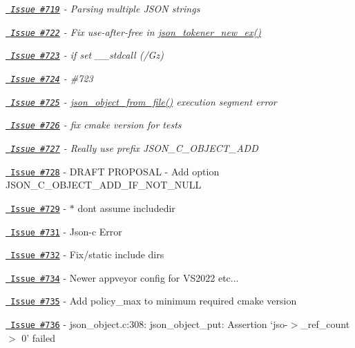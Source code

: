\begin{DoxyItemize}
\item {\itshape \href{https://github.com/json-c/json-c/issues/719}{\texttt{ Issue \#719}} -\/ Parsing multiple JSON strings}
\item {\itshape \href{https://github.com/json-c/json-c/issues/722}{\texttt{ Issue \#722}} -\/ Fix use-\/after-\/free in \mbox{\hyperlink{json__tokener_8h_a6a1583ddd434e13515d6232de813462e}{json\+\_\+tokener\+\_\+new\+\_\+ex()}}}
\item {\itshape \href{https://github.com/json-c/json-c/issues/723}{\texttt{ Issue \#723}} -\/ if set \+\_\+\+\_\+stdcall (/\+Gz)}
\item {\itshape \href{https://github.com/json-c/json-c/issues/724}{\texttt{ Issue \#724}} -\/ \#723}
\item {\itshape \href{https://github.com/json-c/json-c/issues/725}{\texttt{ Issue \#725}} -\/ \mbox{\hyperlink{json__util_8h_a03119ec0a71af4eee95318e9b2aaf05b}{json\+\_\+object\+\_\+from\+\_\+file()}} execution segment error}
\item {\itshape \href{https://github.com/json-c/json-c/issues/726}{\texttt{ Issue \#726}} -\/ fix cmake version for tests}
\item {\itshape \href{https://github.com/json-c/json-c/issues/727}{\texttt{ Issue \#727}} -\/ Really use prefix JSON\+\_\+\+C\+\_\+\+OBJECT\+\_\+\+ADD}
\item \href{https://github.com/json-c/json-c/issues/728}{\texttt{ Issue \#728}} -\/ DRAFT PROPOSAL -\/ Add option JSON\+\_\+\+C\+\_\+\+OBJECT\+\_\+\+ADD\+\_\+\+IF\+\_\+\+NOT\+\_\+\+NULL
\item \href{https://github.com/json-c/json-c/issues/729}{\texttt{ Issue \#729}} -\/ $\ast$ don\textquotesingle{}t assume includedir
\item \href{https://github.com/json-c/json-c/issues/731}{\texttt{ Issue \#731}} -\/ Json-\/c Error
\item \href{https://github.com/json-c/json-c/issues/732}{\texttt{ Issue \#732}} -\/ Fix/static include dirs
\item \href{https://github.com/json-c/json-c/issues/734}{\texttt{ Issue \#734}} -\/ Newer appveyor config for VS2022 etc...
\item \href{https://github.com/json-c/json-c/issues/735}{\texttt{ Issue \#735}} -\/ Add policy\+\_\+max to minimum required cmake version
\item \href{https://github.com/json-c/json-c/issues/736}{\texttt{ Issue \#736}} -\/ json\+\_\+object.\+c\+:308\+: json\+\_\+object\+\_\+put\+: Assertion `jso-\/$>$\+\_\+ref\+\_\+count $>$ 0' failed

\end{DoxyItemize}
